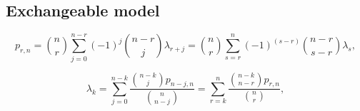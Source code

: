 \documentclass[reqno]{amsart}
\begin{document}
\subsection{Exchangeable model}

\begin{equation}\label{E:1to1}
	p_{r,n}= \binom{n}{r} \sum_{j=0}^{n-r} {(-1)^j} \binom{n-r}{j} \lambda_{r+j} = \binom{n}{r} \sum_{s=r}^{n} {(-1)^{(s-r)}} \binom{n-r}{s-r} \lambda_{s},
\end{equation}

\begin{equation}\label{E:also1to1}
	\lambda_k = \sum_{j=0}^{n-k} \frac{\binom{n-k}{j} {p_{n-j,n}}}{\binom{n}{n-j}} = \sum_{r=k}^{n} \frac{\binom{n-k}{n-r} {p_{r,n}}}{\binom{n}{r}},
\end{equation}
\end{document}
